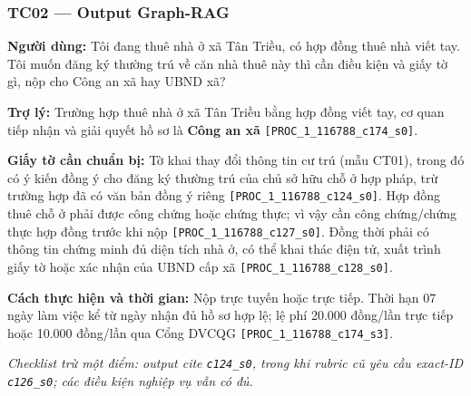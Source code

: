 \documentclass[11pt,a4paper]{article}
\newcommand{\src}[1]{\texttt{#1}}
\begin{document}
\subsubsection*{TC02 --- Output Graph-RAG}
\begin{questionbox}
\textbf{Người dùng:} Tôi đang thuê nhà ở xã Tân Triều, có hợp đồng thuê nhà viết tay. Tôi muốn đăng ký thường trú về căn nhà thuê này thì cần điều kiện và giấy tờ gì, nộp cho Công an xã hay UBND xã?
\end{questionbox}
\begin{answerbox}
\textbf{Trợ lý:} Trường hợp thuê nhà ở xã Tân Triều bằng hợp đồng viết tay, cơ quan tiếp nhận và giải quyết hồ sơ là \textbf{Công an xã} \src{[PROC\_1\_116788\_c174\_s0]}.

\textbf{Giấy tờ cần chuẩn bị:} Tờ khai thay đổi thông tin cư trú (mẫu CT01), trong đó có ý kiến đồng ý cho đăng ký thường trú của chủ sở hữu chỗ ở hợp pháp, trừ trường hợp đã có văn bản đồng ý riêng \src{[PROC\_1\_116788\_c124\_s0]}. Hợp đồng thuê chỗ ở phải được công chứng hoặc chứng thực; vì vậy cần công chứng/chứng thực hợp đồng trước khi nộp \src{[PROC\_1\_116788\_c127\_s0]}. Đồng thời phải có thông tin chứng minh đủ diện tích nhà ở, có thể khai thác điện tử, xuất trình giấy tờ hoặc xác nhận của UBND cấp xã \src{[PROC\_1\_116788\_c128\_s0]}.

\textbf{Cách thực hiện và thời gian:} Nộp trực tuyến hoặc trực tiếp. Thời hạn 07 ngày làm việc kể từ ngày nhận đủ hồ sơ hợp lệ; lệ phí 20.000 đồng/lần trực tiếp hoặc 10.000 đồng/lần qua Cổng DVCQG \src{[PROC\_1\_116788\_c174\_s3]}.
\end{answerbox}
\textit{Checklist trừ một điểm: output cite \src{c124\_s0}, trong khi rubric cũ yêu cầu exact-ID \src{c126\_s0}; các điều kiện nghiệp vụ vẫn có đủ.}
\end{document}
